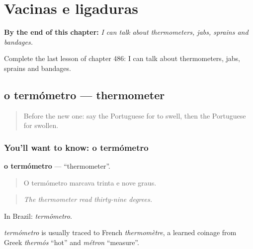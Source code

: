 
\chapter{Vacinas e ligaduras}
\label{ch:pt-vacinas-e-ligaduras}

\begin{chapteropening}
\textbf{By the end of this chapter:} \emph{I can talk about thermometers, jabs, sprains and bandages.}

Complete the last lesson of chapter 486: I can talk about thermometers, jabs, sprains and bandages.
\end{chapteropening}

\section[o termómetro]{o termómetro — thermometer}

\label{lesson:PT-C486-termometro}



\begin{quote}
Before the new one: say the Portuguese for to swell, then the Portuguese for swollen.
\end{quote}

\subsection*{You'll want to know: o termómetro}
\textbf{o termómetro} — \textquotedblleft{}thermometer\textquotedblright{}.

\begin{quote}
O termómetro marcava trinta e nove graus.
\end{quote}

\begin{quote}
\emph{The thermometer read thirty-nine degrees.}
\end{quote}

In Brazil: \emph{termômetro}.

\begin{cousinweb}
\emph{termómetro} is usually traced to French \emph{thermomètre}, a learned coinage from Greek \emph{thermós} \textquotedblleft{}hot\textquotedblright{} and \emph{métron} \textquotedblleft{}measure\textquotedblright{}.
\end{cousinweb}

